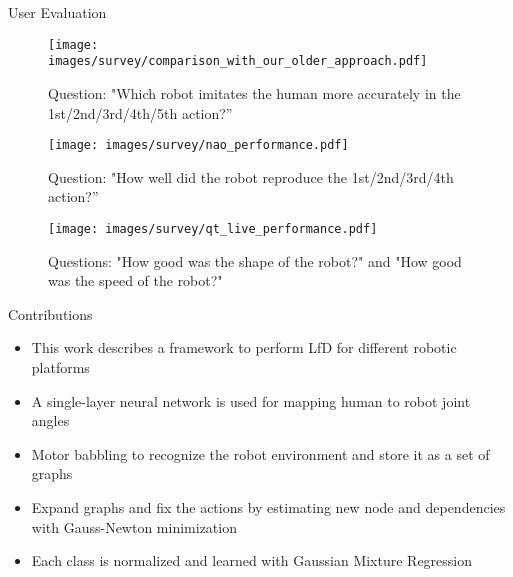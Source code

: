 \documentclass[aspectratio=169]{beamer}
\begin{document}
\begin{frame}{User Evaluation}  
	\hspace*{-0.25cm} 
	\begin{minipage}{0.32\linewidth} 	
		\begin{figure}[h!]
			\texttt{[image: images/survey/comparison\_with\_our\_older\_approach.pdf]}
			\caption{Question: "Which robot imitates the human more accurately in the 1st/2nd/3rd/4th/5th action?”}
		\end{figure}
	\end{minipage}
	\hspace*{0.1cm}	
	\begin{minipage}{0.32\linewidth}	
		\begin{figure}[h!]
			\texttt{[image: images/survey/nao\_performance.pdf]}
			\caption{Question: "How well did the robot reproduce the 1st/2nd/3rd/4th action?”}
		\end{figure}
	\end{minipage}
	\hspace*{0.1cm} 	
	\begin{minipage}{0.32\linewidth}	  
		\begin{figure}[h!]
			\texttt{[image: images/survey/qt\_live\_performance.pdf]}
			\caption{Questions: "How good was the shape of the robot?" and "How good was the speed of the robot?"}
		\end{figure}
	\end{minipage}		
\end{frame}

\begin{frame}{Contributions}	
	\begin{itemize}
		\item This work describes a framework to perform LfD for different robotic platforms
		\newline
		\item A single-layer neural network is used for mapping human to robot joint angles
		\newline
		\item Motor babbling to recognize the robot environment and store it as a set of graphs
		\newline
		\item Expand graphs and fix the actions by estimating new node and dependencies with Gauss-Newton minimization 
		\newline
		\item Each class is normalized and learned with Gaussian Mixture Regression

	\end{itemize}
 \end{frame}
\end{document}
